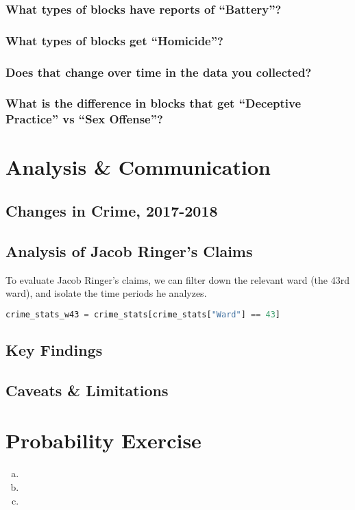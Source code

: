 \documentclass[11pt]{article}
\begin{document}
\subsubsection{What types of blocks have reports of “Battery”?}
\subsubsection{What types of blocks get “Homicide”?}
\subsubsection{Does that change over time in the data you collected?}
\subsubsection{What is the difference in blocks that get “Deceptive Practice” vs “Sex Offense”?}


\section{Analysis \& Communication}
\subsection{Changes in Crime, 2017-2018}
\subsection{Analysis of Jacob Ringer's Claims}
To evaluate Jacob Ringer's claims, we can filter down the relevant ward (the 43rd ward), and isolate the time periods he analyzes.
\begin{lstlisting}[language=Python,numbers=none]
crime_stats_w43 = crime_stats[crime_stats["Ward"] == 43]
\end{lstlisting}


\subsection{Key Findings}

\subsection{Caveats \& Limitations}

\section{Probability Exercise}
\begin{enumerate}[a)]
\item 
\item 
\item 
\end{enumerate}
\end{document}
